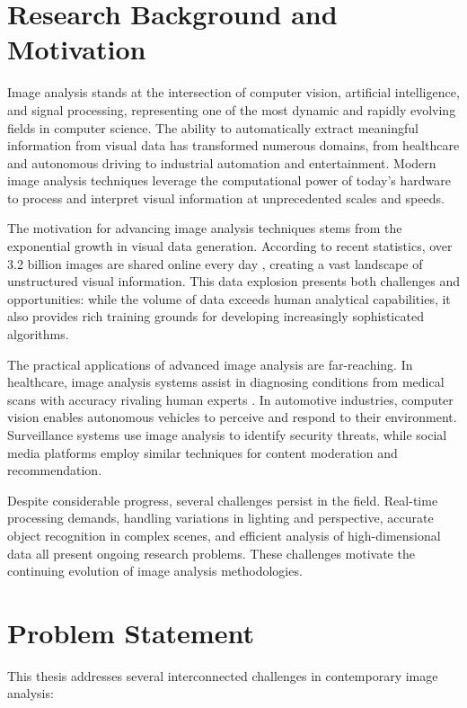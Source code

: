 \section{Research Background and Motivation}
Image analysis stands at the intersection of computer vision, artificial intelligence, and signal processing, representing one of the most dynamic and rapidly evolving fields in computer science. The ability to automatically extract meaningful information from visual data has transformed numerous domains, from healthcare and autonomous driving to industrial automation and entertainment. Modern image analysis techniques leverage the computational power of today's hardware to process and interpret visual information at unprecedented scales and speeds.

The motivation for advancing image analysis techniques stems from the exponential growth in visual data generation. According to recent statistics, over 3.2 billion images are shared online every day \cite{visualData2024}, creating a vast landscape of unstructured visual information. This data explosion presents both challenges and opportunities: while the volume of data exceeds human analytical capabilities, it also provides rich training grounds for developing increasingly sophisticated algorithms.

The practical applications of advanced image analysis are far-reaching. In healthcare, image analysis systems assist in diagnosing conditions from medical scans with accuracy rivaling human experts \cite{medicalImaging2023}. In automotive industries, computer vision enables autonomous vehicles to perceive and respond to their environment. Surveillance systems use image analysis to identify security threats, while social media platforms employ similar techniques for content moderation and recommendation.

Despite considerable progress, several challenges persist in the field. Real-time processing demands, handling variations in lighting and perspective, accurate object recognition in complex scenes, and efficient analysis of high-dimensional data all present ongoing research problems. These challenges motivate the continuing evolution of image analysis methodologies.

\section{Problem Statement}
This thesis addresses several interconnected challenges in contemporary image analysis:


